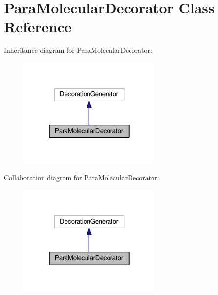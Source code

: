 \hypertarget{classParaMolecularDecorator}{}\section{Para\+Molecular\+Decorator Class Reference}
\label{classParaMolecularDecorator}


Inheritance diagram for Para\+Molecular\+Decorator\+:\nopagebreak
\begin{figure}[H]
\begin{center}
\leavevmode
\includegraphics[width=202pt]{classParaMolecularDecorator__inherit__graph}
\end{center}
\end{figure}


Collaboration diagram for Para\+Molecular\+Decorator\+:\nopagebreak
\begin{figure}[H]
\begin{center}
\leavevmode
\includegraphics[width=202pt]{classParaMolecularDecorator__coll__graph}
\end{center}
\end{figure}
